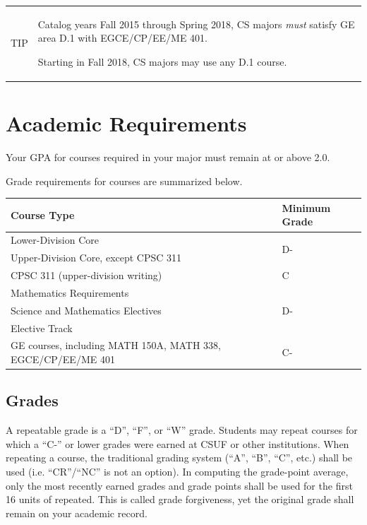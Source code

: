 \documentclass{book}
\newenvironment{tip}{
  \tcolorbox \begin{tabular}{m{.5in} m{5.25in}}
    \Large{TIP} &
}{
  \end{tabular} \endtcolorbox
}
\begin{document}

\begin{tip}
 Catalog years Fall 2015 through Spring 2018, CS majors \emph{must}
 satisfy GE area D.1 with EGCE/CP/EE/ME 401.

 Starting in Fall 2018, CS majors may use any D.1 course.
\end{tip}

\section{Academic Requirements}

Your GPA for courses required in your major must remain at or above 2.0.

Grade requirements for courses are summarized below.

\begin{center}
\begin{tabular}{|p{3in}|l|} \hline
  \textbf{Course Type} & \textbf{Minimum Grade} \\ \hline
  Lower-Division Core & \multirow{2}{*}{D-} \\
  Upper-Division Core, except CPSC 311 & \\ \hline
  CPSC 311 (upper-division writing) & C \\ \hline
  Mathematics Requirements & \multirow{3}{*}{D-} \\
  Science and Mathematics Electives & \\
  Elective Track & \\ \hline
  GE courses, including MATH 150A, MATH 338, EGCE/CP/EE/ME 401 & \multirow{2}{*}{C-} \\ \hline
\end{tabular}
\end{center}

\subsection{Grades}
\label{subsection:grades}
A repeatable grade is a ``D'', ``F'', or ``W'' grade. Students may
repeat courses for which a ``C-'' or lower grades were earned at CSUF
or other institutions. When repeating a course, the traditional
grading system (``A'', ``B'', ``C'', etc.) shall be used
(i.e. ``CR''/``NC'' is not an option). In computing the grade-point
average, only the most recently earned grades and grade points shall
be used for the first 16 units of repeated. This is called grade
forgiveness, yet the original grade shall remain on your academic
record.
\end{document}
